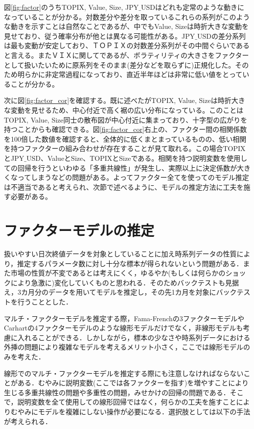 \documentclass[11pt]{jreport}
\begin{document}
図\ref{fig:factor}のうちTOPIX, Value, Size, JPY$\_$USDはどれも定常のような動きになっていることが分かる。対数差分や差分を取っているこれらの系列がこのような動きを示すことは自然なことであるが、中でもValue, Sizeは時折大きな変動を見せており、従う確率分布が他とは異なる可能性がある。JPY$\_$USDの差分系列は最も変動が安定しており、ＴＯＰＩＸの対数差分系列がその中間ぐらいであると言える。またＶＩＸに関してであるが、ボラティリティの大きさをファクターとして扱いたいために原系列をそのまま(差分などを取らずに)正規化した。そのため明らかに非定常過程になっており、直近半年ほどは非常に低い値をとっていることが分かる。

次に図\ref{fig:factor_cor}を確認する。既に述べたがTOPIX, Value, Sizeは時折大きな変動を見せるため、中心付近で高く裾の広い分布になっている。このことはTOPIX, Value, Size同士の散布図が中心付近に集まっており、十字型の広がりを持つことからも確認できる。図\ref{fig:factor_cor}右上の、ファクター間の相関係数を100倍した数値を確認すると、全体的に低くまとまっているものの、低い相関を持つファクターの組み合わせが存在することが見て取れる。この場合TOPIXとJPY$\_$USD、ValueとSize、TOPIXとSizeである。相関を持つ説明変数を使用しての回帰を行うといわゆる「多重共線性」が発生し、実際以上に決定係数が大きくなってしまうなどの問題がある。よってファクター全てを使ってのモデル推定は不適当であると考えられ、次節で述べるように、モデルの推定方法に工夫を施す必要がある。

\section{ファクターモデルの推定}
扱いやすい日次終値データを対象としていることに加え時系列データの性質により，推定するパラメータ数に対し十分な標本が得られないという問題がある．また市場の性質が不変であるとは考えにくく，ゆるやか(もしくは何らかのショックにより急激に)変化していくものと思われる．そのためバックテストも見据え，3カ月分のデータを用いてモデルを推定し，その先1カ月を対象にバックテストを行うこととした．

マルチ・ファクターモデルを推定する際，Fama-Frenchの3ファクターモデルやCarhartの4ファクターモデルのような線形モデルだけでなく，非線形モデルも考慮に入れることができる．しかしながら，標本の少なさや時系列データにおける外挿の問題により複雑なモデルを考えるメリット小さく，ここでは線形モデルのみを考えた．

線形でのマルチ・ファクターモデルを推定する際にも注意しなければならないことがある．むやみに説明変数(ここでは各ファクターを指す)を増やすことにより生じる多重共線性の問題や多重性の問題，みせかけの回帰の問題である．そこで，説明変数を全て使用しての線形回帰ではなく，何らかの工夫を施すことによりむやみにモデルを複雑にしない操作が必要になる．選択肢としては以下の手法が考えられる．
\end{document}
